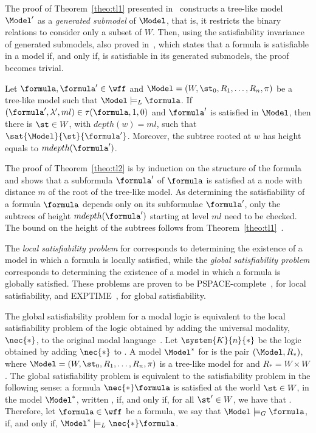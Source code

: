 \begin{example}
    The proof of Theorem~\ref{theo:tl1} presented in~\cite{blackburn2002modal}
    constructs a tree-like model $\Model'$ as a \emph{generated submodel} of
    $\Model$, that is, it restricts the binary relations to consider only a
    subset of $W$. Then, using the satisfiability invariance of generated
    submodels, also proved in~\cite{blackburn2002modal}, which states that a
    formula is satisfiable in a model if, and only if, is satisfiable in its
    generated submodels, the proof becomes trivial.

    \begin{theorem}%
        \label{theo:tl2}
        Let $\formula, \formula' \in \wff$ and $\Model = (W, \st_0, R_1, \ldots,
        R_n, \pi)$ be a tree-like model such that $\Model \models_L \formula$. If
        $(\formula', \lambda', ml) \in \tau(\formula, 1, 0)$ and
        $\formula'$ is satisfied in $\Model$, then there is $\st \in W$, with
        $depth(w) = ml$, such that $\sat{\Model}{\st}{\formula'}$. Moreover,
        the subtree rooted at $w$ has height equals to $mdepth(\formula')$.
    \end{theorem}

    The proof of Theorem~\ref{theo:tl2} is by induction on the structure of the
    formula and shows that a subformula $\formula'$ of $\formula$ is satisfied
    at a node with distance $m$ of the root of the tree-like model. As
    determining the satisfiability of a formula $\formula$ depends only on its
    subformulae $\formula'$, only the subtrees of height $mdepth(\formula')$
    starting at level $ml$ need to be checked. The bound on the height of the
    subtrees follows from Theorem~\ref{theo:tl1}~\cite{nalon2015modal}.
\end{example}

The \emph{local satisfiability problem} for  corresponds to
determining the existence of a model in which a formula is locally satisfied,
while the \emph{global satisfiability problem} corresponds to determining the
existence of a model in which a formula is globally satisfied. These problems
are proven to be PSPACE-complete~\cite{Spaan:coml}, for local satisfiability,
and EXPTIME~, for global satisfiability\cite{Spaan:coml}.

The global satisfiability problem for a modal logic is equivalent to the local
satisfiability problem of the logic obtained by adding the universal modality,
$\nec{*}$, to the original modal language~\cite{goranko1992using}. Let
$\system{K}{n}{*}$ be the logic obtained by adding $\nec{*}$ to .
A model $\Model^*$ for  is the pair $(\Model, R_*)$, where
$\Model = (W, \st_0, R_1, \ldots, R_n, \pi)$ is a tree-like model for
 and $R_* = W \times W$. The global satisfiability problem is
equivalent to the satisfiability problem in the following sense: a formula
$\nec{*} \formula$ is satisfied at the world $\st \in W$, in the model
$\Model^*$, written \sat{\Model^*}{\st}{\nec{*}\formula}, if, and only if, for
all $\st' \in W$, we have that . Therefore, let
$\formula \in \wff$ be a formula, we say that $\Model \models_G \formula$, if,
and only if, $\Model^* \models_L \nec{*} \formula$. 

